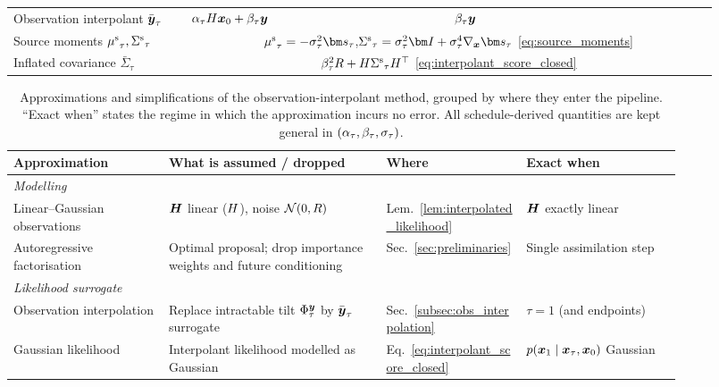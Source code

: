 \begin{table}[ht]
\begin{tabular}{p{0.235\linewidth}|p{0.345\linewidth}|p{0.345\linewidth}}
        Observation interpolant $\bar{\boldsymbol{y}}_\tau$
            & $\alpha_\tau H\boldsymbol{x}_0 + \beta_\tau\boldsymbol{y}$
            & $\beta_\tau\boldsymbol{y}$ \\
        Source moments ${\mu^{\mathrm{s}}}_\tau,{\Sigma^{\mathrm{s}}}_\tau$
            & \multicolumn{2}{c}{$\srcmean_\tau=-\sigpath_\tau^2\genscore_\tau$,\quad $\srccov_\tau=\sigpath_\tau^2\bI+\sigpath_\tau^4\nabla_{\bx}\genscore_\tau$ \eqref{eq:source_moments}} \\
        Inflated covariance $\bar\Sigma_\tau$
            & \multicolumn{2}{c}{$\beta_\tau^2R+H{\Sigma^{\mathrm{s}}}_\tau H^\top$ \eqref{eq:interpolant_score_closed}} \\
        \bottomrule
    \end{tabular}
\end{table}

\begin{table}[ht]
    \centering
    \caption{Approximations and simplifications of the observation-interpolant
    method, grouped by where they enter the pipeline. ``Exact when'' states the
    regime in which the approximation incurs no error. All schedule-derived
    quantities are kept general in $(\alpha_\tau,\beta_\tau,\sigma_\tau)$.}
    \label{tab:approximations}
    \small
    \begin{tabular}{p{0.20\linewidth} p{0.29\linewidth} p{0.18\linewidth} p{0.20\linewidth}}
        \toprule
        \textbf{Approximation} & \textbf{What is assumed / dropped} & \textbf{Where} & \textbf{Exact when} \\
        \midrule
        \multicolumn{4}{l}{\emph{Modelling}}\\
        Linear--Gaussian observations & $\boldsymbol{H}$ linear ($H$), noise $\mathcal N(0,R)$ & Lem.~\ref{lem:interpolated_likelihood} & $\boldsymbol{H}$ exactly linear \\
        Autoregressive factorisation & Optimal proposal; drop importance weights and future conditioning & Sec.~\ref{sec:preliminaries} & Single assimilation step \\
        \midrule
        \multicolumn{4}{l}{\emph{Likelihood surrogate}}\\
        Observation interpolation & Replace intractable tilt $\Phi_\tau^{\boldsymbol{y}}$ by $\bar{\boldsymbol{y}}_\tau$ surrogate & Sec.~\ref{subsec:obs_interpolation} & $\tau=1$ (and endpoints) \\
        Gaussian likelihood & Interpolant likelihood modelled as Gaussian & Eq.~\eqref{eq:interpolant_score_closed} & $p(\boldsymbol{x}_1\mid\boldsymbol{x}_\tau,\boldsymbol{x}_0)$ Gaussian \\

\end{tabular}
\end{table}
